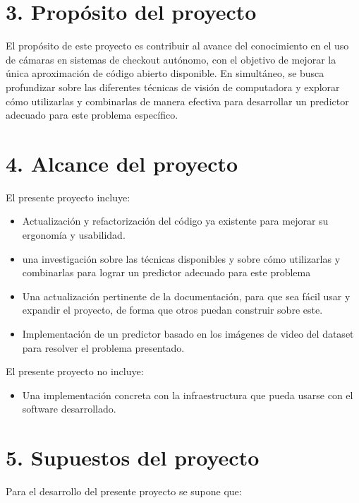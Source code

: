 \documentclass[
11pt, %
]{charter}
\begin{document}
\section{3. Propósito del proyecto}
\label{sec:proposito}

El propósito de este proyecto es contribuir al avance del conocimiento en el uso de cámaras en sistemas de checkout autónomo, con el objetivo de mejorar la única aproximación de código abierto disponible. En simultáneo, se busca profundizar sobre las diferentes técnicas de visión de computadora y explorar cómo utilizarlas y combinarlas de manera efectiva para desarrollar un predictor adecuado para este problema específico.

\section{4. Alcance del proyecto}
\label{sec:alcance}

El presente proyecto incluye:
\begin{itemize}

\item Actualización y refactorización del código ya existente para mejorar su ergonomía y usabilidad.
\item una investigación sobre las técnicas disponibles y sobre cómo utilizarlas y combinarlas para lograr un predictor adecuado para este problema
\item Una actualización pertinente de la documentación, para que sea fácil usar y expandir el proyecto, de forma que otros puedan construir sobre este.
\item Implementación de un predictor basado en los imágenes de video del dataset para resolver el problema presentado.
\end{itemize}

El presente proyecto no incluye:
\begin{itemize}
\item Una implementación concreta con la infraestructura que pueda usarse con el software desarrollado.
\end{itemize}


\section{5. Supuestos del proyecto}
\label{sec:supuestos}

Para el desarrollo del presente proyecto se supone que:
\end{document}
